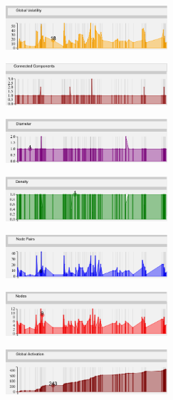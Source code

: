 \begin{multicols}{2}
\begin{center}
\includegraphics[trim={0 0 0 0}, width=60mm]{./Figures/TurinGlobalVolatility.png}
\end{center}
\begin{center}
\includegraphics[trim={0 0 0 0}, width=60mm]{./Figures/TurinConnectedComponents.png}
\end{center}
\begin{center}
\includegraphics[trim={0 0 0 0}, width=60mm]{./Figures/TurinDiameter.png}
\end{center}
\begin{center}
\includegraphics[trim={0 0 0 0}, width=60mm]{./Figures/TurinDensity.png}
\end{center}
\begin{center}
\includegraphics[trim={0 0 0 0}, width=60mm]{./Figures/TurinNodePairs.png}
\end{center}
\begin{center}
\includegraphics[trim={0 0 0 0}, width=60mm]{./Figures/TurinNodes.png}
\end{center}
\begin{center}
\includegraphics[trim={0 0 0 0}, width=60mm]{./Figures/TurinGlobalActivation.png}

\end{center}
\end{multicols}
